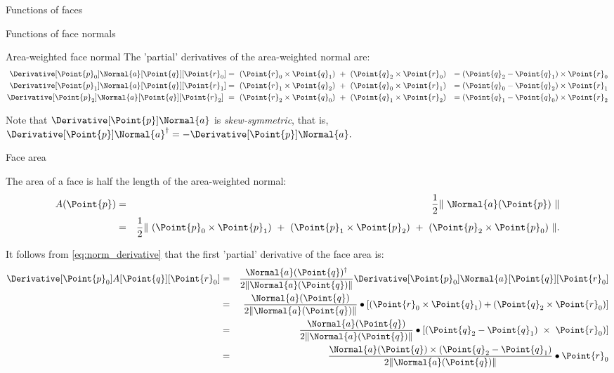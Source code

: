 \begin{plSection}{Functions of faces}
\begin{plSection}{Functions of face normals}
\begin{plSection}{Area-weighted face normal}
The 'partial' derivatives of the area-weighted normal are:
\begin{eqnarray}
\Derivative[\Point{p}_0]{\Normal{a}}[\Point{q}][\Point{r}_0] 
& = \ (\Point{r}_0 \times \Point{q}_1) \ + \ (\Point{q}_2 
\times \Point{r}_0) 
& = (\Point{q}_2 - \Point{q}_1) \times \Point{r}_0 \\
\Derivative[\Point{p}_1]{\Normal{a}}[\Point{q}][\Point{r}_1]
& = \ (\Point{r}_1 \times \Point{q}_2) \ 
+ \ (\Point{q}_0 \times \Point{r}_1) 
& = (\Point{q}_0 - \Point{q}_2) \times \Point{r}_1 \nonumber \\
\Derivative[\Point{p}_2]{\Normal{a}}[\Point{q}][\Point{r}_2] \
& = \ (\Point{r}_2 \times \Point{q}_0) \ 
+ \ (\Point{q}_1 \times \Point{r}_2) 
& = (\Point{q}_1 - \Point{q}_0) \times \Point{r}_2 \nonumber
\end{eqnarray}

Note that 
$\Derivative[\Point{p}]{\Normal{a}}$ 
is {\it skew-symmetric}, that is,
$\Derivative[\Point{p}]{\Normal{a}}^{\dagger} 
= -\Derivative[\Point{p}]{\Normal{a}}.$

\end{plSection}%
\begin{plSection}{Face area}
\label{sec:facearea}

The area of a face is half the length of the area-weighted normal:
\begin{eqnarray}
A(\Point{p})
& = & \frac{1}{2} \| \ \Normal{a}(\Point{p}) \ \|  \\
& = & \frac{1}{2} \| \ (\Point{p}_0 \times \Point{p}_1) \ + \ (\Point{p}_1 \times \Point{p}_2) \ + \ (\Point{p}_2 \times \Point{p}_0) \ \|.
\nonumber
\end{eqnarray}

It follows from \cref{eq:norm_derivative}
that the first 'partial' derivative of the face area is:
\begin{eqnarray}
\label{eq:area_partial_derivative}
\Derivative[\Point{p}_0]{A}[\Point{q}][\Point{r}_0]
& = &
\frac{\Normal{a}(\Point{q})^\dagger}{2\|\Normal{a}(\Point{q})\|}
{
\Derivative[\Point{p}_0]{\Normal{a}}[\Point{q}][\Point{r}_0]
}  \\
& = &
\frac{\Normal{a}(\Point{q})}{2\|\Normal{a}(\Point{q})\|}
\bullet
\left[(\Point{r}_0 \times \Point{q}_1) 
+ (\Point{q}_2 \times \Point{r}_0)\right] \nonumber \\
& = &
\frac{\Normal{a}(\Point{q})}{2\|\Normal{a}(\Point{q})\|}
\bullet
\left[(\Point{q}_2 - \Point{q}_1) 
\ \times \  \Point{r}_0)\right] \nonumber \\
& = &
\frac{\Normal{a}(\Point{q}) 
\times (\Point{q}_2 - \Point{q}_1)}{2\|\Normal{a}(\Point{q})\|}
\bullet
\Point{r}_0 \nonumber
\end{eqnarray}


\end{plSection}
\end{plSection}
\end{plSection}
